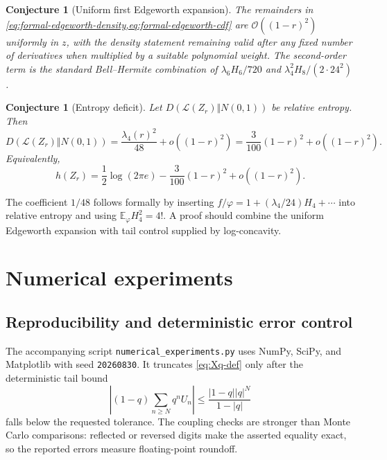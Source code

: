 \documentclass[11pt]{article}
\newtheorem{conjecture}[theorem]{Conjecture}
\theoremstyle{definition}
\newcommand{\E}{\mathbb E}
\newcommand{\Law}{\mathcal L}
\newcommand{\abs}[1]{\left\lvert #1\right\rvert}
\newcommand{\phiN}{\varphi}
\newcommand{\BigO}{\mathcal O}
\begin{document}
\begin{conjecture}[Uniform first Edgeworth expansion]\label{conj:edgeworth}
The remainders in \cref{eq:formal-edgeworth-density,eq:formal-edgeworth-cdf} are
\(\BigO((1-r)^2)\) uniformly in \(z\), with the density statement remaining valid after
any fixed number of derivatives when multiplied by a suitable polynomial weight.
The second-order term is the standard Bell--Hermite combination of
\(\lambda_6H_6/720\) and \(\lambda_4^2H_8/(2\cdot24^2)\).
\end{conjecture}

\begin{conjecture}[Entropy deficit]\label{conj:entropy-deficit}
Let \(D(\Law(Z_r)\Vert N(0,1))\) be relative entropy.  Then
\begin{equation}
 D(\Law(Z_r)\Vert N(0,1))
 =\frac{\lambda_4(r)^2}{48}+o((1-r)^2)
 =\frac{3}{100}(1-r)^2+o((1-r)^2).                        \label{eq:entropy-deficit}
\end{equation}
Equivalently,
\[
 h(Z_r)=\frac12\log(2\pi e)-\frac{3}{100}(1-r)^2+o((1-r)^2).
\]
\end{conjecture}

The coefficient \(1/48\) follows formally by inserting
\(f/\phiN=1+(\lambda_4/24)H_4+\cdots\) into relative entropy and using
\(\E_{\phiN}H_4^2=4!\).  A proof should combine the uniform Edgeworth expansion with
tail control supplied by log-concavity.

\section{Numerical experiments}

\subsection{Reproducibility and deterministic error control}

The accompanying script \texttt{numerical\_experiments.py} uses NumPy, SciPy, and
Matplotlib with seed \texttt{20260830}.  It truncates \cref{eq:Xq-def} only after the
deterministic tail bound
\begin{equation}
 \abs{(1-q)\sum_{n\ge N}q^nU_n}
 \le\frac{\abs{1-q}\abs q^N}{1-\abs q}                  \label{eq:numerical-tail}
\end{equation}
falls below the requested tolerance.  The coupling checks are stronger than Monte Carlo
comparisons: reflected or reversed digits make the asserted equality exact, so the
reported errors measure floating-point roundoff.
\end{document}
